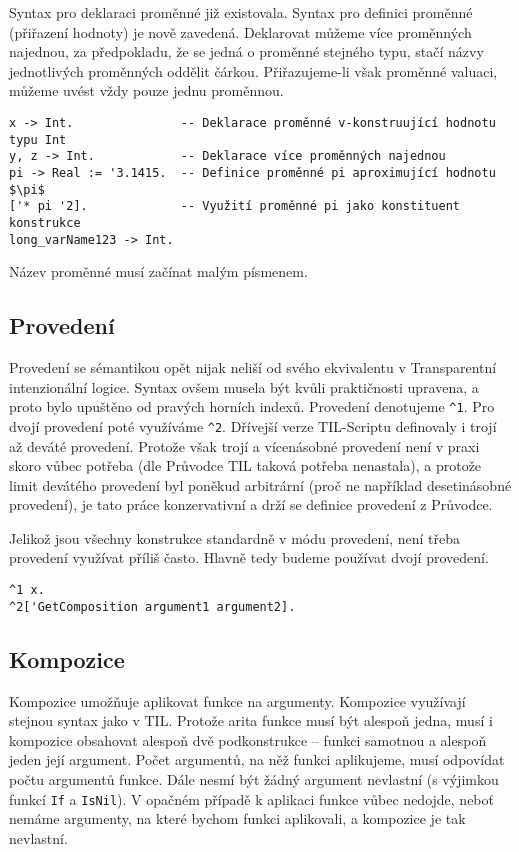 Syntax pro deklaraci proměnné již existovala. Syntax pro definici proměnné (přiřazení hodnoty)
je nově zavedená. Deklarovat můžeme více proměnných najednou, za předpokladu, že se jedná o
proměnné stejného typu, stačí názvy jednotlivých proměnných oddělit čárkou. Přiřazujeme-li však
proměnné valuaci, můžeme uvést vždy pouze jednu proměnnou.

\begin{lstlisting}[caption={Příklad využití proměnných}]
x -> Int.               -- Deklarace proměnné v-konstruující hodnotu typu Int
y, z -> Int.            -- Deklarace více proměnných najednou
pi -> Real := '3.1415.  -- Definice proměnné pi aproximující hodnotu $\pi$
['* pi '2].             -- Využití proměnné pi jako konstituent konstrukce
long_varName123 -> Int.
\end{lstlisting}

Název proměnné musí začínat malým písmenem. 
\subsection{Provedení}

Provedení se sémantikou opět nijak neliší od svého ekvivalentu v Transparentní intenzionální logice.
Syntax ovšem musela být kvůli praktičnosti upravena, a proto bylo upuštěno od pravých horních
indexů. Provedení denotujeme \lstinline{^1}. Pro dvojí provedení poté využíváme \lstinline{^2}.
Dřívejší verze TIL-Scriptu definovaly i trojí až deváté provedení. Protože však trojí a vícenásobné
provedení není v praxi skoro vůbec potřeba (dle Průvodce TIL taková potřeba nenastala), a protože
limit devátého provedení byl poněkud arbitrární (proč ne například desetinásobné provedení), je
tato práce konzervativní a drží se definice provedení z Průvodce.

Jelikož jsou všechny konstrukce standardně v módu provedení, není třeba provedení využívat příliš
často. Hlavně tedy budeme používat dvojí provedení.

\begin{lstlisting}[caption={Příklad využití provedení}]
^1 x.
^2['GetComposition argument1 argument2].
\end{lstlisting}

\subsection{Kompozice}

Kompozice umožňuje aplikovat funkce na argumenty. Kompozice využívají stejnou syntax jako v TIL.
Protože arita funkce musí být alespoň jedna, musí i kompozice obsahovat alespoň dvě podkonstrukce
-- funkci samotnou a alespoň jeden její argument. Počet argumentů, na něž funkci aplikujeme, musí
odpovídat počtu argumentů funkce. Dále nesmí být žádný argument nevlastní (s výjimkou funkcí
\lstinline{If} a \lstinline{IsNil}). V opačném případě k aplikaci funkce vůbec nedojde, neboť
nemáme argumenty, na které bychom funkci aplikovali, a kompozice je tak nevlastní.

